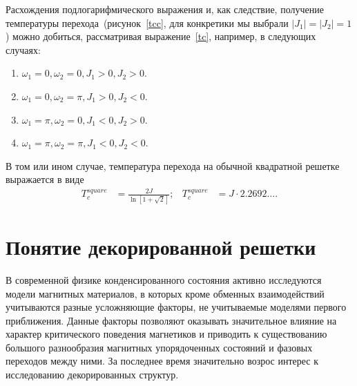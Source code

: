 
Расхождения подлогарифмического выражения и, как следствие, получение температуры перехода~(рисунок~\ref{tcc}, для конкретики мы выбрали $|J_1| = |J_2| = 1$) можно добиться, рассматривая выражение~\eqref{tc}, например, в следующих случаях:
\begin{enumerate}
    \item $\omega_1 = 0, \omega_2 = 0, J_1 > 0, J_2 > 0$.
    \item $\omega_1 = 0, \omega_2 = \pi, J_1 > 0, J_2 < 0$.
    \item $\omega_1 = \pi, \omega_2 = 0, J_1 < 0, J_2 > 0$.
    \item $\omega_1 = \pi, \omega_2 = \pi, J_1 < 0, J_2 < 0$.
\end{enumerate}

В том или ином случае, температура перехода на обычной квадратной решетке выражается в виде
\begin{align}
T_c^{square} &= \frac{2J}{\ln [1 + \sqrt{2}]};& T_c^{square} &= J\cdot 2.2692\dots.
\end{align}

\section{Понятие декорированной решетки} 

В современной физике конденсированного состояния активно исследуются модели магнитных материалов, в которых кроме обменных взаимодействий учитываются разные усложняющие факторы, не учитываемые моделями первого приближения. Данные факторы позволяют оказывать значительное влияние на характер критического поведения магнетиков и приводить к существованию большого разнообразия магнитных упорядоченных состояний и фазовых переходов между ними. За последнее время значительно возрос интерес к исследованию декорированных структур.

